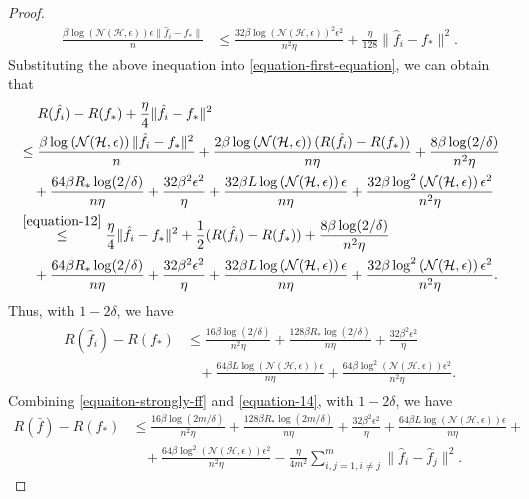 \documentclass{article}
\begin{document}
\begin{proof}
\begin{align*}
    \frac{\beta \log\left(\mathcal{N}(\mathcal{H},\epsilon)\right)\epsilon \|\hat{f}_i-f_\ast\|}{n}
    &\leq \frac{32\beta \log\left(\mathcal{N}(\mathcal{H},\epsilon)\right)^2\epsilon^2}{n^2\eta}+\frac{\eta }{128}\|\hat{f}_i-f_\ast\|^2.
  \end{align*}
 Substituting the above  inequation into \eqref{equation-first-equation}, we can obtain that
 \begin{align*}
   &~~~~R(\hat{f}_i)-R(f_\ast)+\frac{\eta}{4}\|\hat{f}_i-f_\ast\|^2\\
   &\leq \frac{\beta \log\left(\mathcal{N}(\mathcal{H},\epsilon)\right)\|\hat{f}_i-f_\ast\|^2}{n}+
   \frac{2\beta \log\left(\mathcal{N}(\mathcal{H},\epsilon)\right)(R(\hat{f}_i)-R(f_\ast))}{n\eta}+\frac{8\beta \log(2/\delta)}{n^2\eta}\\
   &~~~+\frac{64\beta R_\ast\log(2/\delta)}{n\eta}+\frac{32\beta^2\epsilon^2}{\eta}+
   \frac{32\beta L \log\left(\mathcal{N}(\mathcal{H},\epsilon)\right)\epsilon}{n\eta}+
   \frac{32\beta \log^2\left(\mathcal{N}(\mathcal{H},\epsilon)\right)\epsilon^2}{n^2\eta}\\
   &\overset{\eqref{equation-12}}{\leq}
   \frac{\eta}{4}\|\hat{f}_i-f_\ast\|^2+\frac{1}{2}(R(\hat{f}_i)-R(f_\ast))+\frac{8\beta \log(2/\delta)}{n^2\eta}\\
   &~~~+\frac{64\beta R_\ast\log(2/\delta)}{n\eta}+\frac{32\beta^2\epsilon^2}{\eta}+
   \frac{32\beta L \log\left(\mathcal{N}(\mathcal{H},\epsilon)\right)\epsilon}{n\eta}+
   \frac{32\beta \log^2\left(\mathcal{N}(\mathcal{H},\epsilon)\right)\epsilon^2}{n^2\eta}.
 \end{align*}
 Thus, with $1-2\delta$, we have
 \begin{align}
    \label{equation-14}
    \begin{aligned}
    R(\hat{f}_i)-R(f_\ast)&\leq
    \frac{16\beta \log(2/\delta)}{n^2\eta}+\frac{128\beta R_\ast\log(2/\delta)}{n\eta}+\frac{32\beta^2\epsilon^2}{\eta}\\
    &~~~~+
   \frac{64\beta L \log\left(\mathcal{N}(\mathcal{H},\epsilon)\right)\epsilon}{n\eta}+
   \frac{64\beta \log^2\left(\mathcal{N}(\mathcal{H},\epsilon)\right)\epsilon^2}{n^2\eta}.
   \end{aligned}
  \end{align}
  Combining \eqref{equaiton-strongly-ff} and \eqref{equation-14},
  with $1-2\delta$,
  we have
  \begin{align*}
    R(\bar{f})-R(f_\ast)&\leq
    \frac{16\beta \log(2m/\delta)}{n^2\eta}+\frac{128\beta R_\ast\log(2m/\delta)}{n\eta}+\frac{32\beta^2\epsilon^2}{\eta}+
   \frac{64\beta L \log\left(\mathcal{N}(\mathcal{H},\epsilon)\right)\epsilon}{n\eta}+\\
   &~~~~+
   \frac{64\beta \log^2\left(\mathcal{N}(\mathcal{H},\epsilon)\right)\epsilon^2}{n^2\eta}
  -\frac{\eta}{4m^2}\sum_{i,j=1,i\not=j}^m\|\hat{f}_i-\hat{f}_j\|^2.
  \end{align*}
\end{proof}
\end{document}
